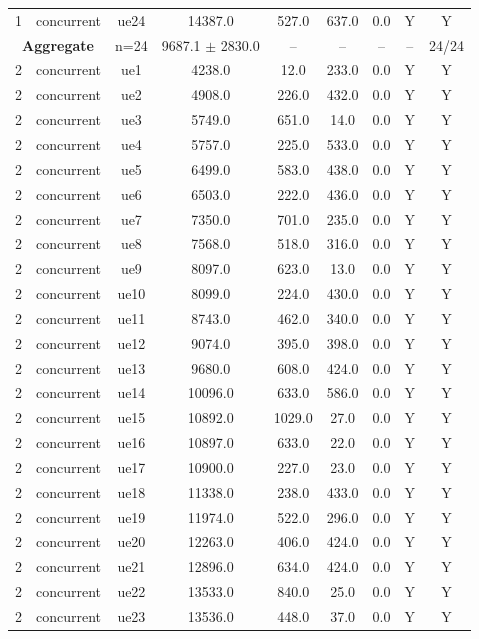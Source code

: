 \begin{table}[ht]
\begin{tabular}{|c|c|c|c|c|c|c|c|c|}
1 & concurrent & ue24 & 14387.0 & 527.0 & 637.0 & 0.0 & Y & Y \\
\multicolumn{2}{|c|}{\textbf{Aggregate}} & n=24 & 9687.1 $\pm$ 2830.0 & -- & -- & -- & -- & 24/24 \\
\hline
2 & concurrent & ue1 & 4238.0 & 12.0 & 233.0 & 0.0 & Y & Y \\
2 & concurrent & ue2 & 4908.0 & 226.0 & 432.0 & 0.0 & Y & Y \\
2 & concurrent & ue3 & 5749.0 & 651.0 & 14.0 & 0.0 & Y & Y \\
2 & concurrent & ue4 & 5757.0 & 225.0 & 533.0 & 0.0 & Y & Y \\
2 & concurrent & ue5 & 6499.0 & 583.0 & 438.0 & 0.0 & Y & Y \\
2 & concurrent & ue6 & 6503.0 & 222.0 & 436.0 & 0.0 & Y & Y \\
2 & concurrent & ue7 & 7350.0 & 701.0 & 235.0 & 0.0 & Y & Y \\
2 & concurrent & ue8 & 7568.0 & 518.0 & 316.0 & 0.0 & Y & Y \\
2 & concurrent & ue9 & 8097.0 & 623.0 & 13.0 & 0.0 & Y & Y \\
2 & concurrent & ue10 & 8099.0 & 224.0 & 430.0 & 0.0 & Y & Y \\
2 & concurrent & ue11 & 8743.0 & 462.0 & 340.0 & 0.0 & Y & Y \\
2 & concurrent & ue12 & 9074.0 & 395.0 & 398.0 & 0.0 & Y & Y \\
2 & concurrent & ue13 & 9680.0 & 608.0 & 424.0 & 0.0 & Y & Y \\
2 & concurrent & ue14 & 10096.0 & 633.0 & 586.0 & 0.0 & Y & Y \\
2 & concurrent & ue15 & 10892.0 & 1029.0 & 27.0 & 0.0 & Y & Y \\
2 & concurrent & ue16 & 10897.0 & 633.0 & 22.0 & 0.0 & Y & Y \\
2 & concurrent & ue17 & 10900.0 & 227.0 & 23.0 & 0.0 & Y & Y \\
2 & concurrent & ue18 & 11338.0 & 238.0 & 433.0 & 0.0 & Y & Y \\
2 & concurrent & ue19 & 11974.0 & 522.0 & 296.0 & 0.0 & Y & Y \\
2 & concurrent & ue20 & 12263.0 & 406.0 & 424.0 & 0.0 & Y & Y \\
2 & concurrent & ue21 & 12896.0 & 634.0 & 424.0 & 0.0 & Y & Y \\
2 & concurrent & ue22 & 13533.0 & 840.0 & 25.0 & 0.0 & Y & Y \\
2 & concurrent & ue23 & 13536.0 & 448.0 & 37.0 & 0.0 & Y & Y \\

\end{tabular}
\end{table}
